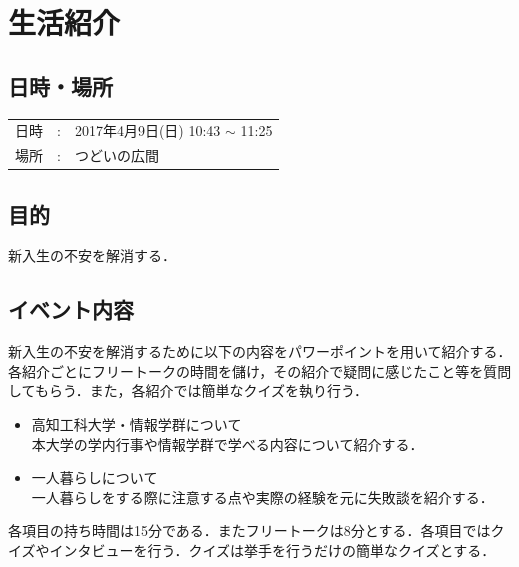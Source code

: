 \documentclass[a4j,titlepage]{jarticle}
\begin{document}
\section{生活紹介}

\subsection{日時・場所}

\begin{tabular}{p{}rp{}}
  日時 & : & 2017年4月9日(日) 10:43 $\sim$ 11:25 \\ %
  場所 & : & つどいの広間
\end{tabular}

\subsection{目的}
新入生の不安を解消する．

\subsection{イベント内容}
新入生の不安を解消するために以下の内容をパワーポイントを用いて紹介する．各紹介ごとにフリートークの時間を儲け，その紹介で疑問に感じたこと等を質問してもらう．また，各紹介では簡単なクイズを執り行う．

\begin{itemize}
\item 高知工科大学・情報学群について \\
  本大学の学内行事や情報学群で学べる内容について紹介する．
\item 一人暮らしについて \\
  一人暮らしをする際に注意する点や実際の経験を元に失敗談を紹介する．
\end{itemize}

各項目の持ち時間は15分である．またフリートークは8分とする．各項目ではクイズやインタビューを行う．クイズは挙手を行うだけの簡単なクイズとする．
\end{document}
